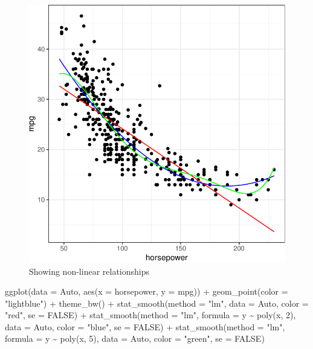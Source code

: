 \documentclass[
]{article}
\newenvironment{Shaded}{\begin{snugshade}}{\end{snugshade}}
\newcommand{\AttributeTok}[1]{\textcolor[rgb]{0.77,0.63,0.00}{#1}}
\newcommand{\ConstantTok}[1]{\textcolor[rgb]{0.00,0.00,0.00}{#1}}
\newcommand{\DecValTok}[1]{\textcolor[rgb]{0.00,0.00,0.81}{#1}}
\newcommand{\FunctionTok}[1]{\textcolor[rgb]{0.00,0.00,0.00}{#1}}
\newcommand{\NormalTok}[1]{#1}
\newcommand{\SpecialCharTok}[1]{\textcolor[rgb]{0.00,0.00,0.00}{#1}}
\newcommand{\StringTok}[1]{\textcolor[rgb]{0.31,0.60,0.02}{#1}}
\begin{document}
\begin{figure}

{\centering \includegraphics{SDM-CHAP24_files/figure-latex/NLR-1} 

}

\caption{Showing non-linear relationships}\label{fig:NLR}
\end{figure}

\begin{Shaded}
\begin{Highlighting}[]
\FunctionTok{ggplot}\NormalTok{(}\AttributeTok{data =}\NormalTok{ Auto, }\FunctionTok{aes}\NormalTok{(}\AttributeTok{x =}\NormalTok{ horsepower, }\AttributeTok{y =}\NormalTok{ mpg)) }\SpecialCharTok{+} 
  \FunctionTok{geom\_point}\NormalTok{(}\AttributeTok{color =} \StringTok{"lightblue"}\NormalTok{) }\SpecialCharTok{+} 
  \FunctionTok{theme\_bw}\NormalTok{() }\SpecialCharTok{+} 
  \FunctionTok{stat\_smooth}\NormalTok{(}\AttributeTok{method =} \StringTok{"lm"}\NormalTok{, }\AttributeTok{data =}\NormalTok{ Auto, }\AttributeTok{color =} \StringTok{"red"}\NormalTok{, }\AttributeTok{se =} \ConstantTok{FALSE}\NormalTok{) }\SpecialCharTok{+} 
  \FunctionTok{stat\_smooth}\NormalTok{(}\AttributeTok{method =} \StringTok{"lm"}\NormalTok{, }\AttributeTok{formula =}\NormalTok{ y }\SpecialCharTok{\textasciitilde{}} \FunctionTok{poly}\NormalTok{(x, }\DecValTok{2}\NormalTok{), }\AttributeTok{data =}\NormalTok{ Auto, }\AttributeTok{color =} \StringTok{"blue"}\NormalTok{, }\AttributeTok{se =} \ConstantTok{FALSE}\NormalTok{) }\SpecialCharTok{+} 
  \FunctionTok{stat\_smooth}\NormalTok{(}\AttributeTok{method =} \StringTok{"lm"}\NormalTok{, }\AttributeTok{formula =}\NormalTok{ y }\SpecialCharTok{\textasciitilde{}} \FunctionTok{poly}\NormalTok{(x, }\DecValTok{5}\NormalTok{), }\AttributeTok{data =}\NormalTok{ Auto, }\AttributeTok{color =} \StringTok{"green"}\NormalTok{, }\AttributeTok{se =} \ConstantTok{FALSE}\NormalTok{) }
\end{Highlighting}
\end{Shaded}
\end{document}
